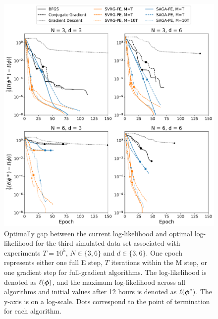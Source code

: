 \documentclass[12pt]{article}
\begin{document}
\begin{figure}[H]
    \centering
    \includegraphics[width=6.5in]{../plt/log-like_v_epoch_T-100000-002.png}
    \caption{Optimally gap between the current log-likelihood and optimal log-likelihood for the third simulated data set associated with experiments $T=10^{5}$, $N \in \{3,6\}$ and $d \in \{3,6\}$. One epoch represents either one full E step, $T$ iterations within the M step, or one gradient step for full-gradient algorithms. The log-likelihood is denoted as $\ell(\boldsymbol{\phi})$, and the maximum log-likelihood across all algorithms and initial values after 12 hours is denoted as $\ell(\boldsymbol{\phi}^*)$. The y-axis is on a log-scale. Dots correspond to the point of termination for each algorithm.}
\end{figure}
%
\end{document}
